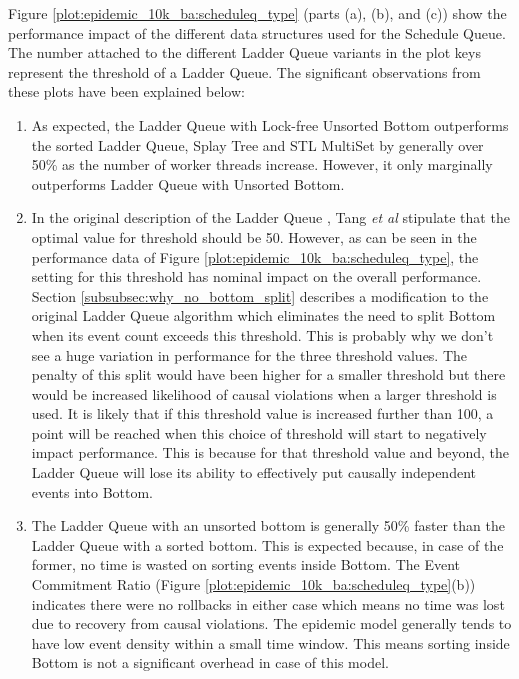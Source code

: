 \documentclass[11pt]{book}
\begin{document}
Figure \ref{plot:epidemic_10k_ba:scheduleq_type} (parts (a), (b), and (c)) show the performance impact of the
different data structures used for the Schedule Queue.  The number attached to the different Ladder Queue
variants in the plot keys represent the threshold of a Ladder Queue. The significant observations from these
plots have been explained below:

\begin{enumerate}

\item As expected, the Ladder Queue with Lock-free Unsorted Bottom outperforms the sorted Ladder Queue, Splay
  Tree and STL MultiSet by generally over 50\% as the number of worker threads increase.  However, it only
  marginally outperforms Ladder Queue with Unsorted Bottom.

\item In the original description of the Ladder Queue \cite{tang-05}, Tang \emph{et al} stipulate that the
  optimal value for threshold should be 50.  However, as can be seen in the performance data of Figure
  \ref{plot:epidemic_10k_ba:scheduleq_type}, the setting for this threshold has nominal impact on the overall
  performance. Section \ref{subsubsec:why_no_bottom_split} describes a modification to the original Ladder
  Queue algorithm which eliminates the need to split Bottom when its event count exceeds this threshold. This
  is probably why we don't see a huge variation in performance for the three threshold values. The penalty of
  this split would have been higher for a smaller threshold but there would be increased likelihood of causal
  violations when a larger threshold is used. It is likely that if this threshold value is increased further
  than 100, a point will be reached when this choice of threshold will start to negatively impact performance.
  This is because for that threshold value and beyond, the Ladder Queue will lose its ability to effectively
  put causally independent events into Bottom.

\item The Ladder Queue with an unsorted bottom is generally 50\% faster than the Ladder Queue with a sorted
  bottom.  This is expected because, in case of the former, no time is wasted on sorting events inside Bottom.
  The Event Commitment Ratio (Figure \ref{plot:epidemic_10k_ba:scheduleq_type}(b)) indicates there were no
  rollbacks in either case which means no time was lost due to recovery from causal violations.  The epidemic
  model generally tends to have low event density within a small time window.  This means sorting inside
  Bottom is not a significant overhead in case of this model.


\end{enumerate}
\end{document}
